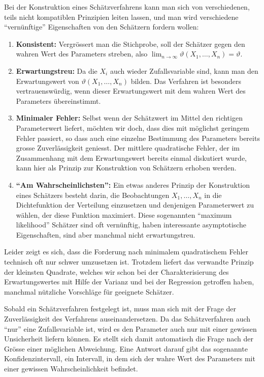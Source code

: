 Bei der Konstruktion eines Schätzverfahrens kann man sich von verschiedenen,
teils nicht kompatiblen Prinzipien leiten lassen, und man wird verschiedene
``vernünftige'' Eigenschaften von den Schätzern fordern wollen:
\begin{enumerate}
\item {\bf Konsistent:} Vergrössert man die Stichprobe, soll der
Schätzer gegen den wahren Wert des Parameters streben, also
$\lim_{n\to\infty}\vartheta(X_1,\dots,X_n)=\vartheta$.
\item {\bf Erwartungstreu:} Da die $X_i$ auch wieder Zufallsvariable sind,
kann man den Erwartungswert von $\vartheta(X_1,\dots,X_n)$ bilden. 
Das Verfahren ist besonders vertrauenswürdig, wenn dieser Erwartungswert
mit dem wahren Wert des Parameters übereinstimmt.
\item {\bf Minimaler Fehler:} Selbst wenn der Schätzwert im Mittel den
richtigen Parameterwert liefert, möchten wir doch, dass dies mit möglichst
geringem Fehler passiert, so dass auch eine einzelne Bestimmung des
Parameters bereits grosse Zuverlässigkeit geniesst.
Der mittlere
quadratische Fehler, der im Zusammenhang mit dem Erwartungswert bereits
einmal diskutiert wurde, kann hier als Prinzip zur Konstruktion von
Schätzern erhoben werden.
\item {\bf ``Am Wahrscheinlichsten'':} Ein etwas anderes Prinzip der 
Konstruktion eines Schätzers besteht darin, die Beobachtungen $X_1,\dots,X_n$
in die Dichtefunktion der Verteilung einzusetzen und denjenigen Parameterwert
zu wählen, der diese Funktion maximiert.
Diese sogenannten
``maximum likelihood'' Schätzer sind oft vernünftig, haben interessante
asymptotische Eigenschaften, sind aber manchmal nicht erwartungstreu.
\end{enumerate}

Leider zeigt es sich, dass die Forderung nach minimalem quadratischem
Fehler technisch oft nur schwer umzusetzen ist.
Trotzdem liefert das verwandte
Prinzip der kleinsten Quadrate, welches wir schon bei der Charakterisierung
des Erwartungswertes mit Hilfe der Varianz und bei der Regression 
getroffen haben, manchmal nützliche Vorschläge für geeignete
Schätzer.

Sobald ein Schätzverfahren festgelegt ist, muss man sich mit der Frage der
Zuverlässigkeit des Verfahrens auseinandersetzen.
Da das Schätzverfahren
auch ``nur'' eine Zufallsvariable ist, wird es den Parameter auch nur
mit einer gewissen Unsicherheit liefern können.
Es stellt sich damit
automatisch die Frage nach der Grösse einer möglichen Abweichung.
Eine Antwort darauf gibt das sogenannte Konfidenzintervall, ein
Intervall, in dem sich der wahre Wert des Parameters mit einer gewissen
Wahrscheinlichkeit befindet.

